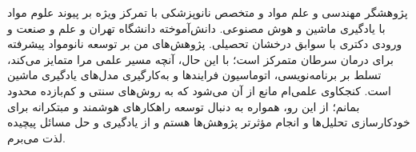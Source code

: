 

\begin{cvparagraph}

پژوهشگر مهندسی و علم مواد و متخصص نانوپزشکی با تمرکز ویژه بر پیوند علوم مواد با یادگیری ماشین و هوش مصنوعی. دانش‌آموخته دانشگاه تهران و علم و صنعت و ورودی دکتری با سوابق درخشان تحصیلی. پژوهش‌های من بر توسعه نانومواد پیشرفته برای درمان سرطان متمرکز است؛ با این حال، آنچه مسیر علمی مرا متمایز می‌کند، تسلط بر برنامه‌نویسی، اتوماسیون فرایندها و به‌کارگیری مدل‌های یادگیری ماشین است. کنجکاوی علمی‌ام مانع از آن می‌شود که به روش‌های سنتی و کم‌بازده محدود بمانم؛ از این رو، همواره به دنبال توسعه راهکارهای هوشمند و مبتکرانه برای خودکارسازی تحلیل‌ها و انجام مؤثرتر پژوهش‌ها هستم و از یادگیری و حل مسائل پیچیده لذت می‌برم.
\end{cvparagraph}
